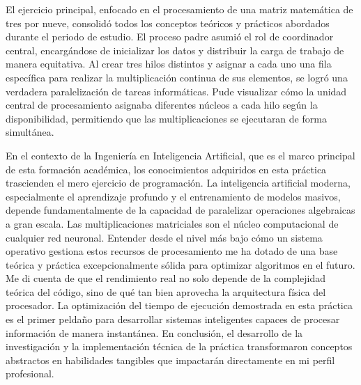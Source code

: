 \documentclass[11pt,a4paper]{article}
\begin{document}
El ejercicio principal, enfocado en el procesamiento de una matriz matemática de tres por nueve, consolidó todos los conceptos teóricos y prácticos abordados durante el periodo de estudio. El proceso padre asumió el rol de coordinador central, encargándose de inicializar los datos y distribuir la carga de trabajo de manera equitativa. Al crear tres hilos distintos y asignar a cada uno una fila específica para realizar la multiplicación continua de sus elementos, se logró una verdadera paralelización de tareas informáticas. Pude visualizar cómo la unidad central de procesamiento asignaba diferentes núcleos a cada hilo según la disponibilidad, permitiendo que las multiplicaciones se ejecutaran de forma simultánea.

En el contexto de la Ingeniería en Inteligencia Artificial, que es el marco principal de esta formación académica, los conocimientos adquiridos en esta práctica trascienden el mero ejercicio de programación. La inteligencia artificial moderna, especialmente el aprendizaje profundo y el entrenamiento de modelos masivos, depende fundamentalmente de la capacidad de paralelizar operaciones algebraicas a gran escala. Las multiplicaciones matriciales son el núcleo computacional de cualquier red neuronal. Entender desde el nivel más bajo cómo un sistema operativo gestiona estos recursos de procesamiento me ha dotado de una base teórica y práctica excepcionalmente sólida para optimizar algoritmos en el futuro. Me di cuenta de que el rendimiento real no solo depende de la complejidad teórica del código, sino de qué tan bien aprovecha la arquitectura física del procesador. La optimización del tiempo de ejecución demostrada en esta práctica es el primer peldaño para desarrollar sistemas inteligentes capaces de procesar información de manera instantánea. En conclusión, el desarrollo de la investigación y la implementación técnica de la práctica transformaron conceptos abstractos en habilidades tangibles que impactarán directamente en mi perfil profesional.
\clearpage
\end{document}
